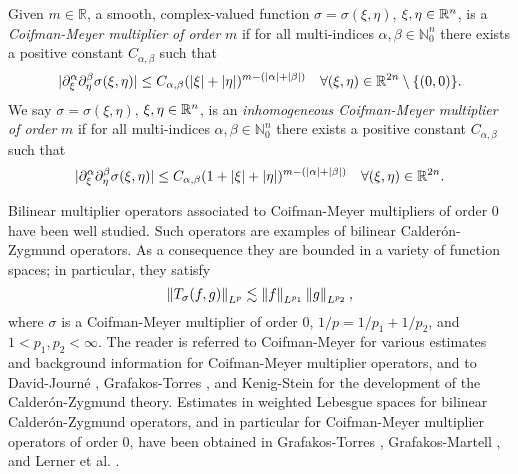 \begin{dfn}\label{CM_def}
Given $m\in\mathbb{R}$, a smooth, complex-valued function $\sigma = \sigma(\xi,\eta)$, $\xi,\eta\in{{\mathbb R}^n}$, is a \textit{Coifman-Meyer multiplier} \textit{of order} $m$ if for all multi-indices $\alpha,\beta\in\mathbb{N}^n_0$ there exists a positive constant $C_{\alpha,\beta}$ such that 
\begin{equation}\label{eq:CMm}
|\partial_\xi^\alpha \partial_\eta^\beta \sigma(\xi, \eta)| \leq C_{\alpha, \beta} (|\xi|+|\eta|)^{m -(\left\vert \alpha \right\vert+ \left\vert \beta \right\vert)} \quad \forall (\xi, \eta) \in \mathbb{R}^{2n} \setminus \{(0,0)\}.
\end{equation}
We say $\sigma = \sigma(\xi,\eta)$, $\xi,\eta\in{{\mathbb R}^n}$, is an \textit{inhomogeneous Coifman-Meyer multiplier} \textit{of order} $m$ if for all multi-indices $\alpha,\beta\in\mathbb{N}^n_0$ there exists a positive constant $C_{\alpha,\beta}$ such that 
\begin{equation}\label{eq:CMm2}
|\partial_\xi^\alpha \partial_\eta^\beta \sigma(\xi, \eta)| \leq C_{\alpha, \beta} (1+|\xi|+|\eta|)^{m -(\left\vert \alpha \right\vert+ \left\vert \beta \right\vert)} \quad \forall (\xi, \eta) \in \mathbb{R}^{2n}.
\end{equation}
\end{dfn}
Bilinear multiplier operators associated to Coifman-Meyer multipliers of order 0 have been well studied. Such operators are examples of bilinear Calder\'on-Zygmund operators. As a consequence they are bounded in a variety of function spaces; in particular, they satisfy
\[ \left\|T_\sigma(f,g)\right\|_{L^p}\lesssim \left\|f\right\|_{L^{p_1}}\left\|g\right\|_{L^{p_2}}, \]
where $\sigma$ is a Coifman-Meyer multiplier of order 0, $1/p = 1/p_1 + 1/p_2$, and $1<p_1,p_2<\infty$. The reader is referred to Coifman-Meyer \cite{MR518170} for various estimates and background information for Coifman-Meyer multiplier operators, and to David-Journ\'{e} \cite{MR763911}, Grafakos-Torres \cite{MR1880324}, and Kenig-Stein \cite{MR1682725} for the development of the Calder\'on-Zygmund theory. Estimates in weighted Lebesgue spaces for bilinear Calder\'on-Zygmund operators, and in particular for Coifman-Meyer multiplier operators of order 0, have been obtained in Grafakos-Torres \cite{MR1947875}, Grafakos-Martell \cite{MR2030573}, and Lerner et al. \cite{MR2483720}. 	


